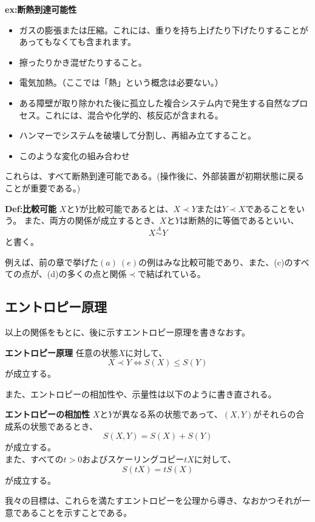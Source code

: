 \documentclass[a4paper,11pt]{jsarticle}
\numberwithin{equation}{section}
\begin{document}
\textbf{ex:断熱到達可能性}\\
\begin{itemize}
    \item ガスの膨張または圧縮。これには、重りを持ち上げたり下げたりすることがあってもなくても含まれます。
    \item 擦ったりかき混ぜたりすること。
    \item 電気加熱。（ここでは「熱」という概念は必要ない。）
    \item ある障壁が取り除かれた後に孤立した複合システム内で発生する自然なプロセス。これには、混合や化学的、核反応が含まれる。
    \item ハンマーでシステムを破壊して分割し、再組み立てすること。
    \item このような変化の組み合わせ
\end{itemize}
これらは、すべて断熱到達可能である。(操作後に、外部装置が初期状態に戻ることが重要である。)\\

\begin{itembox}[l]{\textbf{Def:比較可能}}
    $X$と$Y$が比較可能であるとは、$X \prec Y$または$Y \prec X$であることをいう。
    また、両方の関係が成立するとき、$X$と$Y$は断熱的に等価であるといい、
    \begin{equation}
        X \overset{A}{\sim} Y
    \end{equation}
    と書く。

\end{itembox}
例えば、前の章で挙げた$(a)~(e)$の例はみな比較可能であり、また、(c)のすべての点が、(d)の多くの点と関係$\prec$で結ばれている。\\

\subsection{エントロピー原理}
以上の関係をもとに、後に示すエントロピー原理を書きなおす。
\begin{itembox}[l]{\textbf{エントロピー原理}}
    任意の状態$X$に対して、
    \begin{equation}
        X \prec Y \Leftrightarrow S(X) \leq S(Y)
    \end{equation}
    が成立する。
\end{itembox}
また、エントロピーの相加性や、示量性は以下のように書き直される。
\begin{itembox}[l]{\textbf{エントロピーの相加性}}
    $X$と$Y$が異なる系の状態であって、$(X,Y)$がそれらの合成系の状態であるとき、
    \begin{equation}
        S(X,Y)=S(X)+S(Y)
    \end{equation}
    が成立する。\\
    また、すべての$t>0$およびスケーリングコピー$tX$に対して、
    \begin{equation}
        S(tX)=tS(X)
    \end{equation}
    が成立する。
\end{itembox}
我々の目標は、これらを満たすエントロピーを公理から導き、なおかつそれが一意であることを示すことである。\\
\end{document}
